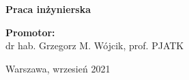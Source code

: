 \documentclass[12pt]{ociamthesis}  %
\begin{document}
\vspace*{1cm}

\begin{center}
{\large \textbf{Praca inżynierska}}
\end{center}

\vspace*{0.2cm}

\begin{flushright}
	
	\begin{minipage}{0.5\textwidth}
		
		\vspace{0.5cm}
		\textbf{Promotor:} \\
		dr hab. Grzegorz M. Wójcik, prof. PJATK
	\end{minipage}
	
	
\end{flushright}


\begin{center}
	\vspace*{\fill}
	Warszawa, wrzesień 2021
\end{center}
\thispagestyle{empty}





\begin{romanpages}          %
\tableofcontents            %

\listoffigures              %
\listoftables      %
\lstlistoflistings
{}
\end{romanpages}            %




%



%
%

\end{document}
